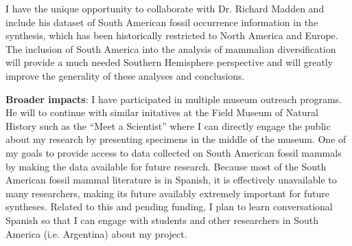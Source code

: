 \documentclass[11pt,letterpaper]{article}
\begin{document}
I have the unique opportunity to collaborate with Dr. Richard Madden and include his dataset of South American fossil occurrence information in the synthesis, which has been historically restricted to North America and Europe. The inclusion of South America into the analysis of mammalian diversification will provide a much needed Southern Hemisphere perspective and will greatly improve the generality of these analyses and conclusions. 


\textbf{Broader impacts}:
I have participated in multiple museum outreach programs. He will to continue with similar initatives at the Field Museum of Natural History such as the ``Meet a Scientist'' where I can directly engage the public about my research by presenting specimens in the middle of the museum. One of my goals to provide access to data collected on South American fossil mammals by making the data available for future research. Because most of the South American fossil mammal literature is in Spanish, it is effectively unavailable to many researchers, making its future availably extremely important for future syntheses. Related to this and pending funding, I plan to learn conversational Spanish so that I can engage with students and other researchers in South America (i.e. Argentina) about my project. 
\end{document}
